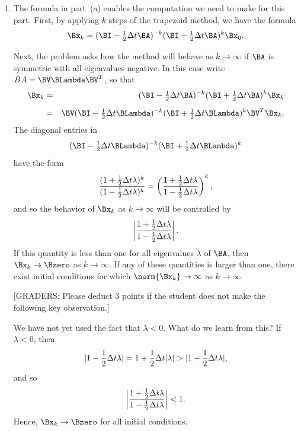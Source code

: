 {\begin{solution}
\begin{enumerate}
      

\item  The formula in part~(a) enables the computation we need to make for this part.
       First, by applying $k$ steps of the trapezoid method, we have the formula 
       \[ \Bx_k = (\BI-{\textstyle{1\over2}}\Delta t \BA)^{-k}
                      (\BI+{\textstyle{1\over2}}\Delta t \BA)^k \Bx_0.\]

       Next, the problem asks how the method will behave as $k\to\infty$ 
       if $\BA$ is symmetric with all eigenvalues negative.
       In this case write $BA = \BV\BLambda\BV^T$, so that
       \begin{eqnarray*}
         \Bx_k &=& (\BI-{\textstyle{1\over2}}\Delta t \BA)^{-k}
                      (\BI+{\textstyle{1\over2}}\Delta t \BA)^k \Bx_k \\[0.5em]
               &=& \BV (\BI-{\textstyle{1\over2}}\Delta t \BLambda)^{-k}
                      (\BI+{\textstyle{1\over2}}\Delta t \BLambda)^k \BV^T\Bx_k.
       \end{eqnarray*}
       The diagonal entries in 
        \[ (\BI-{\textstyle{1\over2}}\Delta t \BLambda)^{-k}
                      (\BI+{\textstyle{1\over2}}\Delta t \BLambda)^k\]
       have the form
       \[ {(1 + {1\over2} \Delta t \lambda)^k \over (1-{1\over2} \Delta t \lambda)^k}
         = \left({1 + {1\over2} \Delta t \lambda \over 1-{1\over2} \Delta t \lambda}\right)^k,\] 
       and so the behavior of $\Bx_k$ as $k\to\infty$ will be controlled by 
        \[ \left|{1 + {1\over2} \Delta t \lambda \over 1-{1\over2} \Delta t \lambda}\right|.\]
       If this quantity is less than one for all eigenvalues $\lambda$ of $\BA$, 
       then $\Bx_k \to \Bzero$ as $k\to\infty$.
       If any of these quantities is larger than one, there exist initial conditions for which
       $\norm{\Bx_k}\to\infty$ as $k\to\infty$.

\vspace*{1em}
       {[GRADERS: Please deduct 3 points if the student does not make the following key observation.]}

\vspace*{1em}
       We have not yet used the fact that $\lambda < 0$.  What do we learn from this?
       If $\lambda<0$, then 
       \[ |1-{1\over2} \Delta t \lambda| = 1+{1\over 2} \Delta t |\lambda| > 
       |1+{1\over 2} \Delta t \lambda|, \]
      and so
        \[ \left|{1 + {1\over2} \Delta t \lambda \over 1-{1\over2} \Delta t \lambda}\right| < 1.\]
      Hence, $\Bx_k \to \Bzero$ for all initial conditions.

\end{enumerate}
\end{solution}}{}

